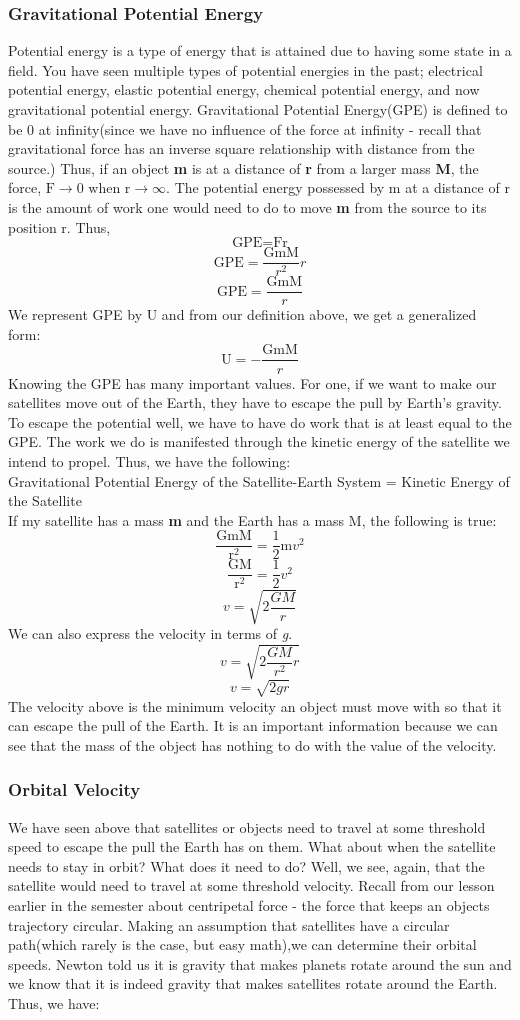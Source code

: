 \documentclass[9pt]{article}
\begin{document}
	\subsubsection*{Gravitational Potential Energy}
	Potential energy is a type of energy that is attained due to having some state in a field. You have seen multiple types of potential energies in the past; electrical potential energy, elastic potential energy, chemical potential energy, and now gravitational potential energy. Gravitational Potential Energy(GPE) is defined to be 0 at infinity(since we have no influence of the force at infinity - recall that gravitational force has an inverse square relationship with distance from the source.) Thus, if an object \textbf{m} is at a distance of \textbf{r} from a larger mass \textbf{M}, the force, $\text{F}\to0\text{ when r}\to\infty$. The potential energy possessed by m at a distance of r is the amount of work one would need to do to move \textbf{m} from the source to its position r. Thus,
	$$\text{GPE}=\text{Fr}$$
	$$\text{GPE}=\dfrac{\text{GmM}}{r^2}r$$
	$$\text{GPE}=\dfrac{\text{GmM}}{r}$$
	We represent GPE by U and from our definition above, we get a generalized form:
	$$\text{U}=-\dfrac{\text{GmM}}{r}$$
	Knowing the GPE has many important values. For one, if we want to make our satellites move out of the Earth, they have to escape the pull by Earth's gravity. To escape the potential well, we have to have do work that is at least equal to the GPE. The work we do is manifested through the kinetic energy of the satellite we intend to propel. Thus, we have the following: \\
	Gravitational Potential Energy of the Satellite-Earth System = Kinetic Energy of the Satellite \\
	If my satellite has a mass \textbf{m} and the Earth has a mass M, the following is true:
	$$\dfrac{\text{GmM}}{\text{r}^2}=\dfrac{1}{2}\text{m}v^2$$
	$$\dfrac{\text{GM}}{\text{r}^2}=\dfrac{1}{2}v^2$$
	$$v=\sqrt{2\dfrac{GM}{r}}$$
	We can also express the velocity in terms of \textit{g}.
	$$v=\sqrt{2\dfrac{GM}{r^2}r}$$
	$$v=\sqrt{2gr}$$
	The velocity above is the minimum velocity an object must move with so that it can escape the pull of the Earth. It is an important information because we can see that the mass of the object has	nothing to do with the value of the velocity.
	\subsubsection*{Orbital Velocity}
	We have seen above that satellites or objects need to travel at some threshold speed to escape the pull the Earth has on them. What about when the satellite needs to stay in orbit? What does it need to do? Well, we see, again, that the satellite would need to travel at some threshold velocity. Recall from our lesson earlier in the semester about centripetal force - the force that keeps an objects trajectory circular. Making an assumption that satellites have a circular path(which rarely is the case, but easy math),we can determine their orbital speeds. Newton told us it is gravity that makes planets rotate around the sun and we know that it is indeed gravity that makes satellites rotate around the Earth. Thus, we have: \\
	
\end{document}
